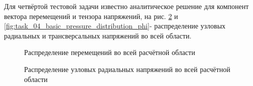 \documentclass[a4paper]{article}
\begin{document}
\newpage

Для четвёртой тестовой задачи известно аналитическое решение для компонент вектора перемещений и тензора напряжений, на рис. \ref{fig:task_04_basic_pressure_distribution_r} и \ref{fig:task_04_basic_pressure_distribution_phi}- распределение узловых радиальных и трансверсальных напряжений во всей области.

\begin{figure}[h]
\caption{Распределение перемещений во всей расчётной области}
\label{fig:task_04_basic_displacement_distribution}
\end{figure}

\newpage

\begin{figure}[h]
\caption{Распределение узловых радиальных напряжений во всей расчётной области}
\label{fig:task_04_basic_pressure_distribution_r}
\end{figure}
\end{document}
